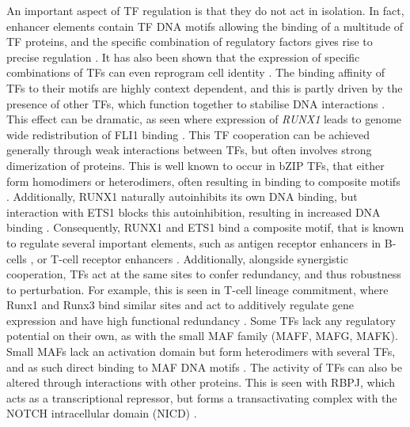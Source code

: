 An important aspect of TF regulation is that they do not act in isolation. In fact, enhancer elements contain TF DNA motifs allowing the binding of a multitude of TF proteins, and the specific combination of regulatory factors gives rise to precise regulation \citep{spitz_transcription_2012, halfon_ras_2000, yuh_complexity_1994, bhattacharjee_combinatorial_2013, reiter_combinatorial_2017}. It has also been shown that the expression of specific combinations of TFs can even reprogram cell identity \citep{schutte_experimentally_2016, riddell_reprogramming_2014, batta_direct_2014, takahashi_induction_2006, xie_stepwise_2004}. The binding affinity of TFs to their motifs are highly context dependent, and this is partly driven by the presence of other TFs, which function together to stabilise DNA interactions \citep{morgunova_structural_2017, spitz_transcription_2012, yanez-cuna_uncovering_2012}. This effect can be dramatic, as seen where expression of \textit{RUNX1} leads to genome wide redistribution of FLI1 binding \citep{lichtinger_runx1_2012}. This TF cooperation can be achieved generally through weak interactions between TFs, but often involves strong dimerization of proteins. This is well known to occur in bZIP TFs, that either form homodimers or heterodimers, often resulting in binding to composite motifs \citep{rodriguez-martinez_combinatorial_2017, miller_importance_2009}. Additionally, RUNX1 naturally autoinhibits its own DNA binding, but interaction with ETS1 blocks this autoinhibition, resulting in increased DNA binding \citep{kim_mutual_1999, goetz_auto-inhibition_2000}. Consequently, RUNX1 and ETS1 bind a composite motif, that is known to regulate several important elements, such as antigen receptor enhancers in B-cells \citep{erman_ets-core_1998}, or T-cell receptor enhancers \citep{mayall_distinct_1997, giese_assembly_1995}. Additionally, alongside synergistic cooperation, TFs act at the same sites to confer redundancy, and thus robustness to perturbation. For example, this is seen in T-cell lineage commitment, where Runx1 and Runx3 bind similar sites and act to additively regulate gene expression and have high functional redundancy \citep{shin_runx1_2021}. Some TFs lack any regulatory potential on their own, as with the small MAF family (MAFF, MAFG, MAFK). Small MAFs lack an activation domain but form heterodimers with several TFs, and as such direct binding to MAF DNA motifs \citep{katsuoka_small_2016}. The activity of TFs can also be altered through interactions with other proteins. This is seen with RBPJ, which acts as a transcriptional repressor, but forms a transactivating complex with the NOTCH intracellular domain (NICD) \citep{kojika_notch_2001}. 

